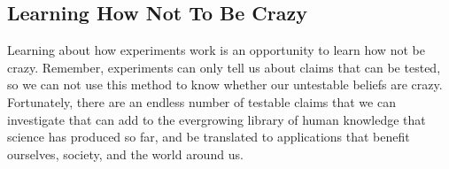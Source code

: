 \subsection{Learning How Not To Be Crazy}
Learning about how experiments work is an opportunity to learn how not be crazy. Remember, experiments can only tell us about claims that can be tested, so we can not use this method to know whether our untestable beliefs are crazy. Fortunately, there are an endless number of testable claims that we can investigate that can add to the evergrowing library of human knowledge that science has produced so far, and be translated to applications that benefit ourselves, society, and the world around us. 

